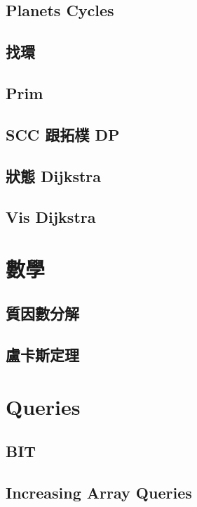 \subsection{Planets Cycles} 

\subsection{找環} 

\subsection{Prim}

\subsection{SCC 跟拓樸 DP}

\subsection{狀態 Dijkstra}

\subsection{Vis Dijkstra}


\section{數學}
\subsection{質因數分解} 

\subsection{盧卡斯定理} 


\section{Queries}
\subsection{BIT} 

\subsection{Increasing Array Queries}

